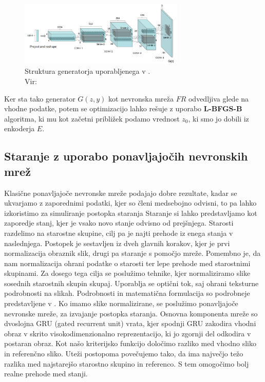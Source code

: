 \documentclass[12pt,a4paper,twoside]{article}
\theoremstyle{definition} %
\theoremstyle{plain} %
\numberwithin{equation}{section}  %
\begin{document}
\begin{figure}[ht]
  \centering
  \includegraphics[width=0.7\textwidth]{images/cgan_architecture}
 \caption[Struktura generatorja uporabljenega v \cite{antipov2017face}]{Struktura generatorja uporabljenega v \cite{antipov2017face}.\\Vir: \cite{radford2015unsupervised}}
  \label{fig:agecgan-generator}
\end{figure}

Ker sta tako generator $G(z,y)$ kot nevronska mreža $FR$ odvedljiva glede na vhodne podatke, potem se optimizacijo lahko rešuje z uporabo \textbf{L-BFGS-B} algoritma, ki mu kot začetni približek podamo vrednost $z_0$, ki smo jo dobili iz enkoderja $E$. 

\subsection{Staranje z uporabo ponavljajočih nevronskih mrež}
Klasične ponavljajoče nevronske mreže podajajo dobre rezultate, kadar se ukvarjamo z zaporednimi podatki, kjer so členi medsebojno odvisni, to pa lahko izkoristimo za simuliranje postopka staranja \cite{wang2016recurrent}
Staranje si lahko predstavljamo kot zaporedje stanj, kjer je vsako novo stanje odvisno od prejšnjega. Starosti razdelimo na starostne skupine, cilj pa je najti prehode iz enega stanja v naslednjega. 
Postopek je sestavljen iz dveh glavnih korakov, kjer je prvi normalizacija obraznik slik, drugi pa staranje s pomočjo mreže. 
Pomembno je, da nam normalizacija ohrani podatke o starosti ter lepe prehode med starostnimi skupinami. 
Za dosego tega cilja se poslužimo tehnike, kjer normaliziramo slike sosednih starostnih skupin skupaj. Uporablja se  optični tok, saj  ohrani teksturne podrobnosti na slikah.  Podrobnosti in matematična formulacija  so podrobneje predstavljene  v 
\cite{wang2016recurrent}. 
Ko imamo slike normalizirane, se poslužimo ponavljajoče nevronske mreže, za izvajanje postopka staranja. 
Osnovna komponenta mreže so dvoslojna GRU (gated recurrent unit) vrata, kjer spodnji GRU zakodira vhodni obraz v skrito visokodimenzionalno reprezentacijo, ki jo zgornji del odkodira v postaran obraz. Kot našo kriterijsko funkcijo 
določimo razliko med vhodno sliko in referenčno sliko. Uteži postopoma povečujemo tako, da ima največjo težo razlika med najstarejšo starostno skupino in referenco. S tem omogočimo bolj realne prehode med stanji.
\end{document}
